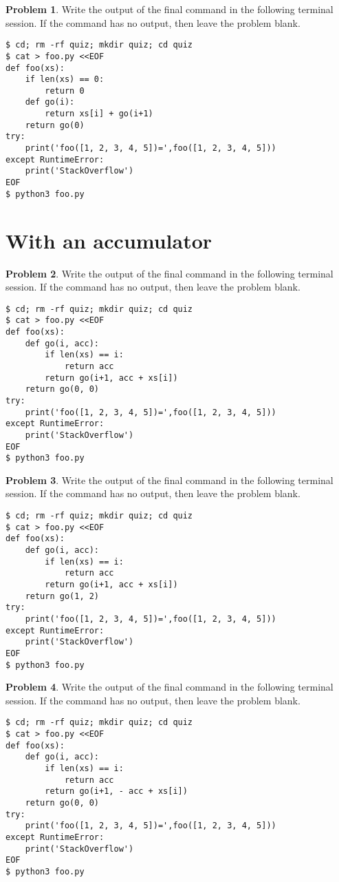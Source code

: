\documentclass[10pt]{article}
\theoremstyle{definition}
\newtheorem{problem}{Problem}
\begin{document}
\filbreak
\begin{problem}
    Write the output of the final command in the following terminal session.
    If the command has no output, then leave the problem blank.
\end{problem}
\begin{lstlisting}
$ cd; rm -rf quiz; mkdir quiz; cd quiz
$ cat > foo.py <<EOF
def foo(xs):
    if len(xs) == 0:
        return 0
    def go(i):
        return xs[i] + go(i+1)
    return go(0)
try:
    print('foo([1, 2, 3, 4, 5])=',foo([1, 2, 3, 4, 5]))
except RuntimeError:
    print('StackOverflow')
EOF
$ python3 foo.py
\end{lstlisting}

\filbreak
\section{With an accumulator}

\begin{problem}
    Write the output of the final command in the following terminal session.
    If the command has no output, then leave the problem blank.
\end{problem}
\begin{lstlisting}
$ cd; rm -rf quiz; mkdir quiz; cd quiz
$ cat > foo.py <<EOF
def foo(xs):
    def go(i, acc):
        if len(xs) == i:
            return acc
        return go(i+1, acc + xs[i])
    return go(0, 0)
try:
    print('foo([1, 2, 3, 4, 5])=',foo([1, 2, 3, 4, 5]))
except RuntimeError:
    print('StackOverflow')
EOF
$ python3 foo.py
\end{lstlisting}

\filbreak
\begin{problem}
    Write the output of the final command in the following terminal session.
    If the command has no output, then leave the problem blank.
\end{problem}
\begin{lstlisting}
$ cd; rm -rf quiz; mkdir quiz; cd quiz
$ cat > foo.py <<EOF
def foo(xs):
    def go(i, acc):
        if len(xs) == i:
            return acc
        return go(i+1, acc + xs[i])
    return go(1, 2)
try:
    print('foo([1, 2, 3, 4, 5])=',foo([1, 2, 3, 4, 5]))
except RuntimeError:
    print('StackOverflow')
EOF
$ python3 foo.py
\end{lstlisting}


\filbreak
\begin{problem}
    Write the output of the final command in the following terminal session.
    If the command has no output, then leave the problem blank.
\end{problem}
\begin{lstlisting}
$ cd; rm -rf quiz; mkdir quiz; cd quiz
$ cat > foo.py <<EOF
def foo(xs):
    def go(i, acc):
        if len(xs) == i:
            return acc
        return go(i+1, - acc + xs[i])
    return go(0, 0)
try:
    print('foo([1, 2, 3, 4, 5])=',foo([1, 2, 3, 4, 5]))
except RuntimeError:
    print('StackOverflow')
EOF
$ python3 foo.py
\end{lstlisting}
\end{document}

